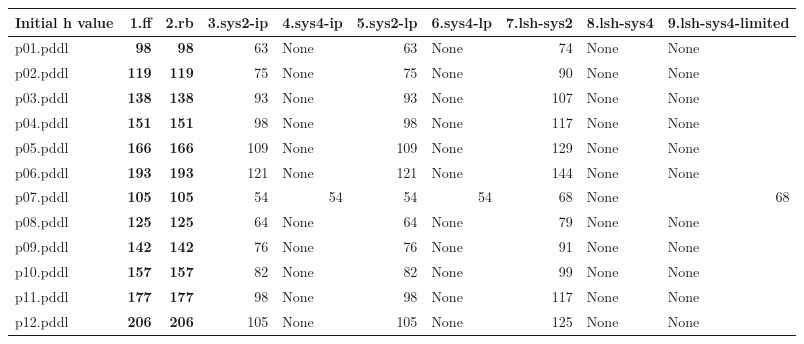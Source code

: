 \documentclass{article}
\begin{document}
\begin{tabular}{@{}lrrrrrrrrr@{}}
Initial h value & 1.ff & 2.rb & 3.sys2-ip & 4.sys4-ip & 5.sys2-lp & 6.sys4-lp & 7.lsh-sys2 & 8.lsh-sys4 & 9.lsh-sys4-limited \\
\midrule
p01.pddl & \textbf{98} & \textbf{98} & 63 & \multicolumn{1}{|l|}{None} & 63 & \multicolumn{1}{|l|}{None} & 74 & \multicolumn{1}{|l|}{None} & \multicolumn{1}{|l|}{None} \\
p02.pddl & \textbf{119} & \textbf{119} & 75 & \multicolumn{1}{|l|}{None} & 75 & \multicolumn{1}{|l|}{None} & 90 & \multicolumn{1}{|l|}{None} & \multicolumn{1}{|l|}{None} \\
p03.pddl & \textbf{138} & \textbf{138} & 93 & \multicolumn{1}{|l|}{None} & 93 & \multicolumn{1}{|l|}{None} & 107 & \multicolumn{1}{|l|}{None} & \multicolumn{1}{|l|}{None} \\
p04.pddl & \textbf{151} & \textbf{151} & 98 & \multicolumn{1}{|l|}{None} & 98 & \multicolumn{1}{|l|}{None} & 117 & \multicolumn{1}{|l|}{None} & \multicolumn{1}{|l|}{None} \\
p05.pddl & \textbf{166} & \textbf{166} & 109 & \multicolumn{1}{|l|}{None} & 109 & \multicolumn{1}{|l|}{None} & 129 & \multicolumn{1}{|l|}{None} & \multicolumn{1}{|l|}{None} \\
p06.pddl & \textbf{193} & \textbf{193} & 121 & \multicolumn{1}{|l|}{None} & 121 & \multicolumn{1}{|l|}{None} & 144 & \multicolumn{1}{|l|}{None} & \multicolumn{1}{|l|}{None} \\
p07.pddl & \textbf{105} & \textbf{105} & 54 & 54 & 54 & 54 & 68 & \multicolumn{1}{|l|}{None} & 68 \\
p08.pddl & \textbf{125} & \textbf{125} & 64 & \multicolumn{1}{|l|}{None} & 64 & \multicolumn{1}{|l|}{None} & 79 & \multicolumn{1}{|l|}{None} & \multicolumn{1}{|l|}{None} \\
p09.pddl & \textbf{142} & \textbf{142} & 76 & \multicolumn{1}{|l|}{None} & 76 & \multicolumn{1}{|l|}{None} & 91 & \multicolumn{1}{|l|}{None} & \multicolumn{1}{|l|}{None} \\
p10.pddl & \textbf{157} & \textbf{157} & 82 & \multicolumn{1}{|l|}{None} & 82 & \multicolumn{1}{|l|}{None} & 99 & \multicolumn{1}{|l|}{None} & \multicolumn{1}{|l|}{None} \\
p11.pddl & \textbf{177} & \textbf{177} & 98 & \multicolumn{1}{|l|}{None} & 98 & \multicolumn{1}{|l|}{None} & 117 & \multicolumn{1}{|l|}{None} & \multicolumn{1}{|l|}{None} \\
p12.pddl & \textbf{206} & \textbf{206} & 105 & \multicolumn{1}{|l|}{None} & 105 & \multicolumn{1}{|l|}{None} & 125 & \multicolumn{1}{|l|}{None} & \multicolumn{1}{|l|}{None} \\

\end{tabular}
\end{document}
